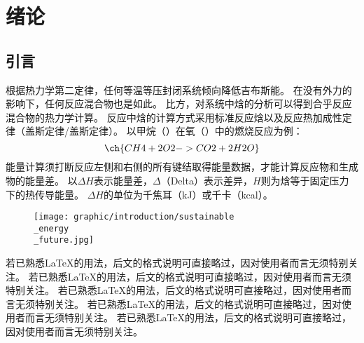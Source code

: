 \chapter{绪论}

\section{引言}

根据热力学第二定律，任何等温等压封闭系统倾向降低吉布斯能。
在没有外力的影响下，任何反应混合物也是如此。
比方，对系统中焓的分析可以得到合乎反应混合物的热力学计算。
反应中焓的计算方式采用标准反应焓以及反应热加成性定律（盖斯定律/盖斯定律）。
以甲烷（）在氧（）中的燃烧反应为例：
\begin{equation}
	\ch{CH4 + 2 O2 -> CO2 + 2 H2O}
\end{equation}
能量计算须打断反应左侧和右侧的所有键结取得能量数据，才能计算反应物和生成物的能量差。
以$\Delta H$表示能量差，$\Delta$（Delta）表示差异，$H$则为焓等于固定压力下的热传导能量。%
$\Delta H$的单位为千焦耳（\unit{\kJ}）或千卡（kcal）。

\begin{figure}[!htbp]
	\centering
	\texttt{[image: graphic/introduction/sustainable\\\_energy\\\_future.jpg]}
	\label{fgr:sustainable_energy_future}
\end{figure}%

若已熟悉\LaTeX{}的用法，后文的格式说明可直接略过，因对使用者而言无须特别关注。
若已熟悉\LaTeX{}的用法，后文的格式说明可直接略过，因对使用者而言无须特别关注。
若已熟悉\LaTeX{}的用法，后文的格式说明可直接略过，因对使用者而言无须特别关注。
若已熟悉\LaTeX{}的用法，后文的格式说明可直接略过，因对使用者而言无须特别关注。
若已熟悉\LaTeX{}的用法，后文的格式说明可直接略过，因对使用者而言无须特别关注。
